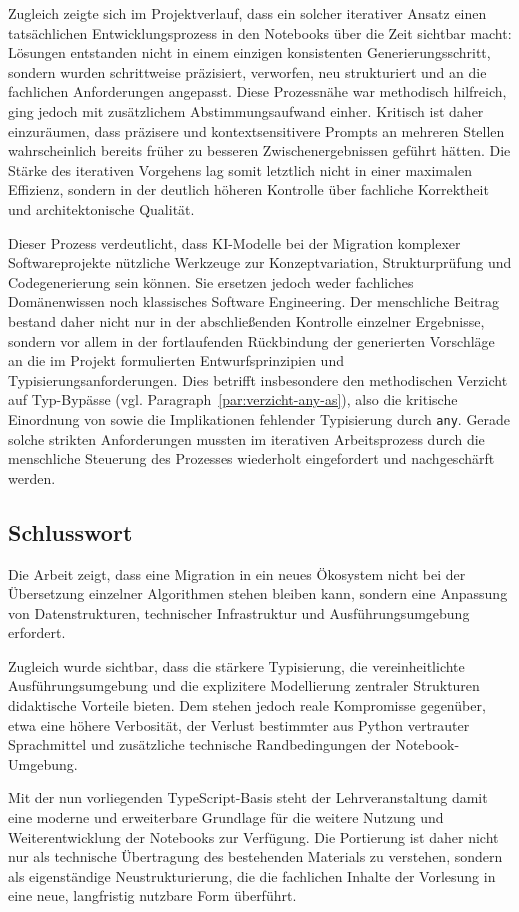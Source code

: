 Zugleich zeigte sich im Projektverlauf, dass ein solcher iterativer Ansatz einen tatsächlichen Entwicklungsprozess in den Notebooks über die Zeit sichtbar macht: Lösungen entstanden nicht in einem einzigen konsistenten Generierungsschritt, sondern wurden schrittweise präzisiert, verworfen, neu strukturiert und an die fachlichen Anforderungen angepasst. Diese Prozessnähe war methodisch hilfreich, ging jedoch mit zusätzlichem Abstimmungsaufwand einher. Kritisch ist daher einzuräumen, dass präzisere und kontextsensitivere Prompts an mehreren Stellen wahrscheinlich bereits früher zu besseren Zwischenergebnissen geführt hätten. Die Stärke des iterativen Vorgehens lag somit letztlich nicht in einer maximalen Effizienz, sondern in der deutlich höheren Kontrolle über fachliche Korrektheit und architektonische Qualität.

Dieser Prozess verdeutlicht, dass KI-Modelle bei der Migration komplexer Softwareprojekte nützliche Werkzeuge zur Konzeptvariation, Strukturprüfung und Codegenerierung sein können. Sie ersetzen jedoch weder fachliches Domänenwissen noch klassisches Software Engineering. Der menschliche Beitrag bestand daher nicht nur in der abschließenden Kontrolle einzelner Ergebnisse, sondern vor allem in der fortlaufenden Rückbindung der generierten Vorschläge an die im Projekt formulierten Entwurfsprinzipien und Typisierungsanforderungen. Dies betrifft insbesondere den methodischen Verzicht auf Typ-Bypässe (vgl. Paragraph~\ref{par:verzicht-any-as}), also die kritische Einordnung von  sowie die Implikationen fehlender Typisierung durch \texttt{any}. Gerade solche strikten Anforderungen mussten im iterativen Arbeitsprozess durch die menschliche Steuerung des Prozesses wiederholt eingefordert und nachgeschärft werden.

\subsection{Schlusswort}

Die Arbeit zeigt, dass eine Migration in ein neues Ökosystem nicht bei der Übersetzung einzelner Algorithmen stehen bleiben kann, sondern eine Anpassung von Datenstrukturen, technischer Infrastruktur und Ausführungsumgebung erfordert.

Zugleich wurde sichtbar, dass die stärkere Typisierung, die vereinheitlichte Ausführungsumgebung und die explizitere Modellierung zentraler Strukturen didaktische Vorteile bieten. Dem stehen jedoch reale Kompromisse gegenüber, etwa eine höhere Verbosität, der Verlust bestimmter aus Python vertrauter Sprachmittel und zusätzliche technische Randbedingungen der Notebook-Umgebung.

Mit der nun vorliegenden TypeScript-Basis steht der Lehrveranstaltung damit eine moderne und erweiterbare Grundlage für die weitere Nutzung und Weiterentwicklung der Notebooks zur Verfügung. Die Portierung ist daher nicht nur als technische Übertragung des bestehenden Materials zu verstehen, sondern als eigenständige Neustrukturierung, die die fachlichen Inhalte der Vorlesung in eine neue, langfristig nutzbare Form überführt.